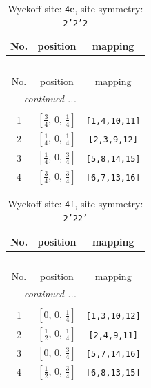 \documentclass[fleqn,8pt]{jsarticle}
\begin{document}
\renewcommand{\arraystretch}{1.2}
\begin{longtable}{ccc}
\caption{Wyckoff site: {\tt 4e}, site symmetry: {\tt 2'2'2}}
 \\
 \hline \hline
No. & position & mapping \\ \hline \endfirsthead

\multicolumn{2}{l}{\tablename\ \thetable{}} \\
 \hline \hline
No. & position & mapping \\ \hline \endhead

 \hline \hline
\multicolumn{2}{r}{\footnotesize\it continued ...} \\ \endfoot

 \hline \hline
\multicolumn{2}{r}{} \\ \endlastfoot

1 & $\left[ \frac{3}{4},\, 0,\, \frac{1}{4} \right]$ & {\tt [1,4,10,11]} \\ \hline
2 & $\left[ \frac{1}{4},\, 0,\, \frac{1}{4} \right]$ & {\tt [2,3,9,12]} \\ \hline
3 & $\left[ \frac{1}{4},\, 0,\, \frac{3}{4} \right]$ & {\tt [5,8,14,15]} \\ \hline
4 & $\left[ \frac{3}{4},\, 0,\, \frac{3}{4} \right]$ & {\tt [6,7,13,16]} \\
\end{longtable}
\renewcommand{\arraystretch}{1.2}
\begin{longtable}{ccc}
\caption{Wyckoff site: {\tt 4f}, site symmetry: {\tt 2'22'}}
 \\
 \hline \hline
No. & position & mapping \\ \hline \endfirsthead

\multicolumn{2}{l}{\tablename\ \thetable{}} \\
 \hline \hline
No. & position & mapping \\ \hline \endhead

 \hline \hline
\multicolumn{2}{r}{\footnotesize\it continued ...} \\ \endfoot

 \hline \hline
\multicolumn{2}{r}{} \\ \endlastfoot

1 & $\left[ 0,\, 0,\, \frac{1}{4} \right]$ & {\tt [1,3,10,12]} \\ \hline
2 & $\left[ \frac{1}{2},\, 0,\, \frac{1}{4} \right]$ & {\tt [2,4,9,11]} \\ \hline
3 & $\left[ 0,\, 0,\, \frac{3}{4} \right]$ & {\tt [5,7,14,16]} \\ \hline
4 & $\left[ \frac{1}{2},\, 0,\, \frac{3}{4} \right]$ & {\tt [6,8,13,15]} \\
\end{longtable}
\end{document}
